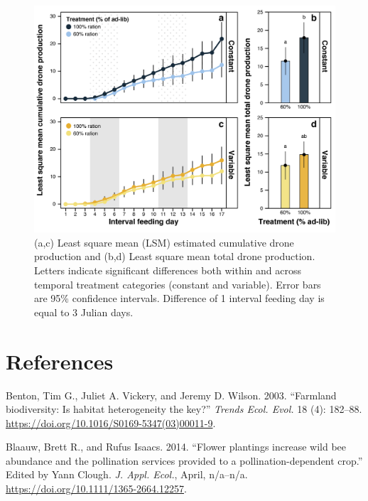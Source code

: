 \documentclass[11pt,]{article}
\begin{document}
\clearpage

\newpage

\begin{figure}
\centering
\includegraphics{./fig4_drones.png}
\caption{(a,c) Least square mean (LSM) estimated cumulative drone
production and (b,d) Least square mean total drone production. Letters
indicate significant differences both within and across temporal
treatment categories (constant and variable). Error bars are 95\%
confidence intervals. Difference of 1 interval feeding day is equal to 3
Julian days.}
\end{figure}

\clearpage

\newpage

\hypertarget{references}{%
\section*{References}\label{references}}

\hypertarget{refs}{}
\leavevmode\hypertarget{ref-Benton2003}{}%
Benton, Tim G., Juliet A. Vickery, and Jeremy D. Wilson. 2003.
``Farmland biodiversity: Is habitat heterogeneity the key?''
\emph{Trends Ecol. Evol.} 18 (4): 182--88.
\url{https://doi.org/10.1016/S0169-5347(03)00011-9}.

\leavevmode\hypertarget{ref-Blaauw2014}{}%
Blaauw, Brett R., and Rufus Isaacs. 2014. ``Flower plantings increase
wild bee abundance and the pollination services provided to a
pollination-dependent crop.'' Edited by Yann Clough. \emph{J. Appl.
Ecol.}, April, n/a--n/a. \url{https://doi.org/10.1111/1365-2664.12257}.
\end{document}
